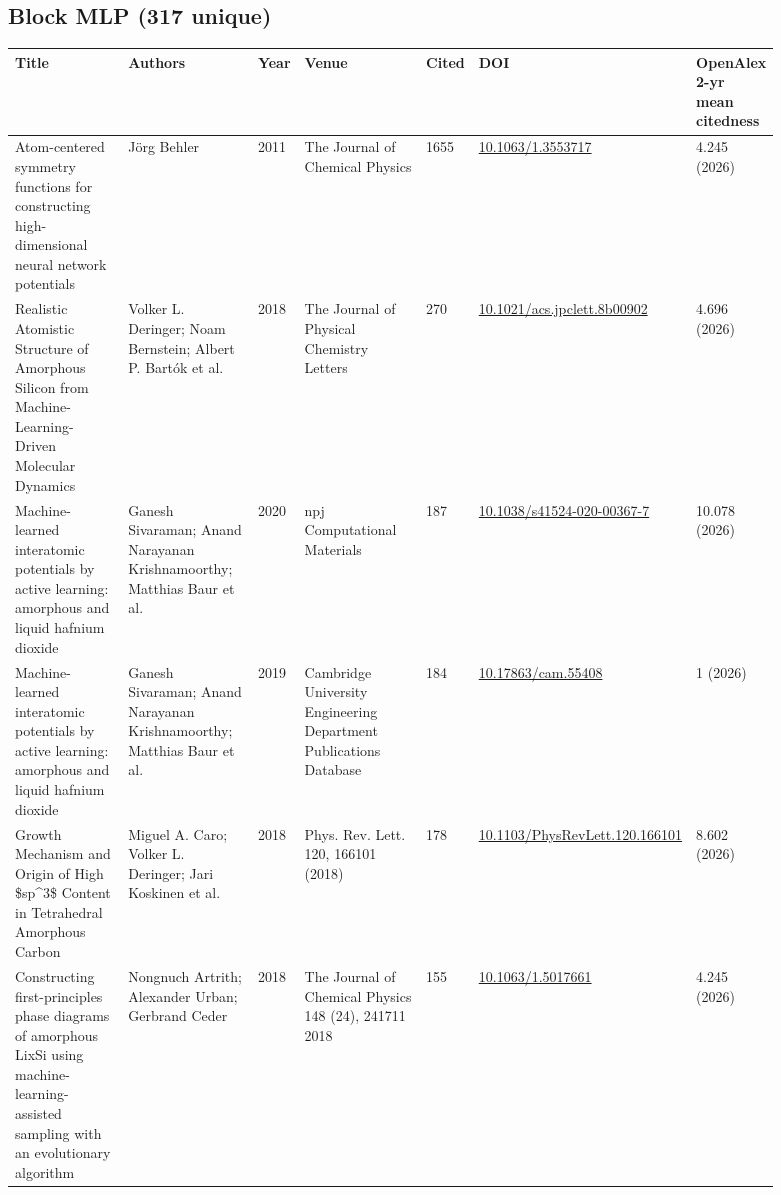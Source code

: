 \documentclass[10pt,a4paper]{article}
\begin{document}
\subsection*{Block MLP (317 unique)}
{\scriptsize\begin{longtable}{p{0.200\linewidth}p{0.200\linewidth}p{0.043\linewidth}p{0.200\linewidth}p{0.043\linewidth}p{0.106\linewidth}p{0.100\linewidth}}
\hline
\textbf{Title} & \textbf{Authors} & \textbf{Year} & \textbf{Venue} & \textbf{Cited} & \textbf{DOI} & \textbf{OpenAlex 2-yr mean citedness} \\ \hline
\endhead
Atom-centered symmetry functions for constructing high-dimensional neural network potentials & Jörg Behler & 2011 & The Journal of Chemical Physics & 1655 & \href{https://doi.org/10.1063/1.3553717}{10.1063/1.3553717} & 4.245 (2026) \\
Realistic Atomistic Structure of Amorphous Silicon from Machine-Learning-Driven Molecular Dynamics & Volker L. Deringer; Noam Bernstein; Albert P. Bartók et al. & 2018 & The Journal of Physical Chemistry Letters & 270 & \href{https://doi.org/10.1021/acs.jpclett.8b00902}{10.1021/acs.jpclett.8b00902} & 4.696 (2026) \\
Machine-learned interatomic potentials by active learning: amorphous and liquid hafnium dioxide & Ganesh Sivaraman; Anand Narayanan Krishnamoorthy; Matthias Baur et al. & 2020 & npj Computational Materials & 187 & \href{https://doi.org/10.1038/s41524-020-00367-7}{10.1038/s41524-020-00367-7} & 10.078 (2026) \\
Machine-learned interatomic potentials by active learning: amorphous and liquid hafnium dioxide & Ganesh Sivaraman; Anand Narayanan Krishnamoorthy; Matthias Baur et al. & 2019 & Cambridge University Engineering Department Publications Database & 184 & \href{https://doi.org/10.17863/cam.55408}{10.17863/cam.55408} & 1 (2026) \\
Growth Mechanism and Origin of High \$sp\^{}3\$ Content in Tetrahedral Amorphous Carbon & Miguel A. Caro; Volker L. Deringer; Jari Koskinen et al. & 2018 & Phys. Rev. Lett. 120, 166101 (2018) & 178 & \href{https://doi.org/10.1103/PhysRevLett.120.166101}{10.1103/PhysRevLett.120.166101} & 8.602 (2026) \\
Constructing first-principles phase diagrams of amorphous LixSi using machine-learning-assisted sampling with an evolutionary algorithm & Nongnuch Artrith; Alexander Urban; Gerbrand Ceder & 2018 & The Journal of Chemical Physics 148 (24), 241711 2018 & 155 & \href{https://doi.org/10.1063/1.5017661}{10.1063/1.5017661} & 4.245 (2026) \\

\end{longtable}}
\end{document}
